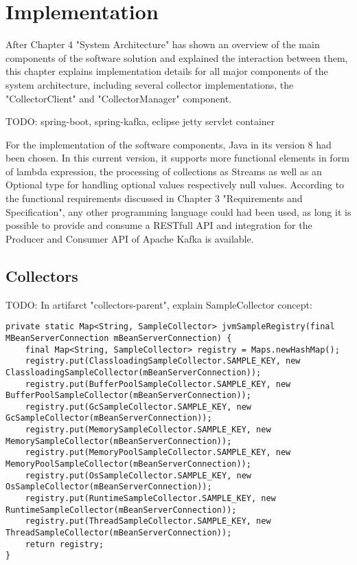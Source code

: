 \chapter{Implementation}

After Chapter 4 "System Architecture" has shown an overview of the main components of the software solution and
explained the interaction between them, this chapter explains implementation details for all major components of
the system architecture, including several collector implementations, the "CollectorClient" and "CollectorManager"
component.

TODO: spring-boot, spring-kafka, eclipse jetty servlet container

For the implementation of the software components, Java in its version 8 had been chosen. In this current version,
it supports more functional elements in form of lambda expression, the processing of collections as Streams as well
as an Optional type for handling optional values respectively null values. According to the functional requirements
discussed in Chapter 3 "Requirements and Specification", any other programming language could had been used, as long
it is possible to provide and consume a RESTfull API and integration for the Producer and Consumer API of Apache
Kafka is available.

\section{Collectors}

TODO: In artifarct "collectors-parent", explain SampleCollector concept:

\begin{lstlisting}[caption={Sample registry for "JvmCollector"}, captionpos=b, label={lst:jvmsampleregistry}]
private static Map<String, SampleCollector> jvmSampleRegistry(final MBeanServerConnection mBeanServerConnection) {
    final Map<String, SampleCollector> registry = Maps.newHashMap();
    registry.put(ClassloadingSampleCollector.SAMPLE_KEY, new ClassloadingSampleCollector(mBeanServerConnection));
    registry.put(BufferPoolSampleCollector.SAMPLE_KEY, new BufferPoolSampleCollector(mBeanServerConnection));
    registry.put(GcSampleCollector.SAMPLE_KEY, new GcSampleCollector(mBeanServerConnection));
    registry.put(MemorySampleCollector.SAMPLE_KEY, new MemorySampleCollector(mBeanServerConnection));
    registry.put(MemoryPoolSampleCollector.SAMPLE_KEY, new MemoryPoolSampleCollector(mBeanServerConnection));
    registry.put(OsSampleCollector.SAMPLE_KEY, new OsSampleCollector(mBeanServerConnection));
    registry.put(RuntimeSampleCollector.SAMPLE_KEY, new RuntimeSampleCollector(mBeanServerConnection));
    registry.put(ThreadSampleCollector.SAMPLE_KEY, new ThreadSampleCollector(mBeanServerConnection));
    return registry;
}
\end{lstlisting}

